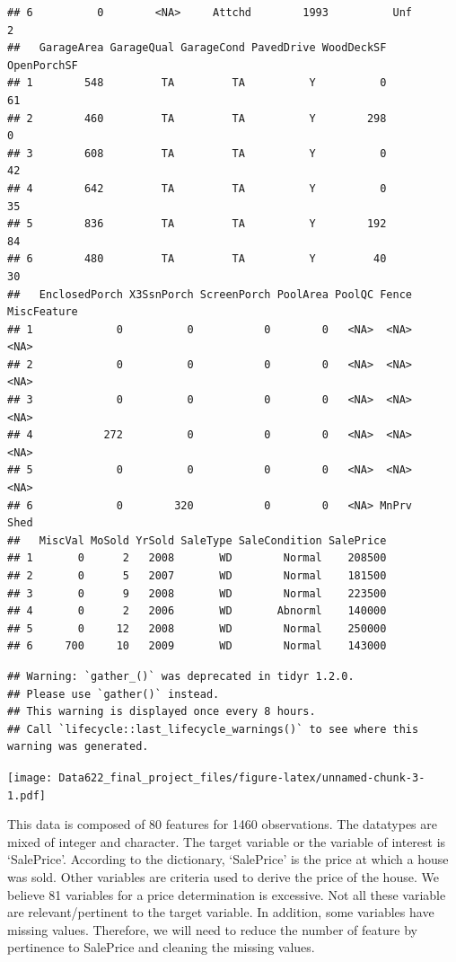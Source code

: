 \documentclass[
]{article}
\begin{document}
\begin{verbatim}
## 6          0        <NA>     Attchd        1993          Unf          2
##   GarageArea GarageQual GarageCond PavedDrive WoodDeckSF OpenPorchSF
## 1        548         TA         TA          Y          0          61
## 2        460         TA         TA          Y        298           0
## 3        608         TA         TA          Y          0          42
## 4        642         TA         TA          Y          0          35
## 5        836         TA         TA          Y        192          84
## 6        480         TA         TA          Y         40          30
##   EnclosedPorch X3SsnPorch ScreenPorch PoolArea PoolQC Fence MiscFeature
## 1             0          0           0        0   <NA>  <NA>        <NA>
## 2             0          0           0        0   <NA>  <NA>        <NA>
## 3             0          0           0        0   <NA>  <NA>        <NA>
## 4           272          0           0        0   <NA>  <NA>        <NA>
## 5             0          0           0        0   <NA>  <NA>        <NA>
## 6             0        320           0        0   <NA> MnPrv        Shed
##   MiscVal MoSold YrSold SaleType SaleCondition SalePrice
## 1       0      2   2008       WD        Normal    208500
## 2       0      5   2007       WD        Normal    181500
## 3       0      9   2008       WD        Normal    223500
## 4       0      2   2006       WD       Abnorml    140000
## 5       0     12   2008       WD        Normal    250000
## 6     700     10   2009       WD        Normal    143000
\end{verbatim}

\begin{verbatim}
## Warning: `gather_()` was deprecated in tidyr 1.2.0.
## Please use `gather()` instead.
## This warning is displayed once every 8 hours.
## Call `lifecycle::last_lifecycle_warnings()` to see where this warning was generated.
\end{verbatim}

\texttt{[image: Data622\_final\_project\_files/figure-latex/unnamed-chunk-3-1.pdf]}

This data is composed of 80 features for 1460 observations. The
datatypes are mixed of integer and character. The target variable or the
variable of interest is `SalePrice'. According to the dictionary,
`SalePrice' is the price at which a house was sold. Other variables are
criteria used to derive the price of the house. We believe 81 variables
for a price determination is excessive. Not all these variable are
relevant/pertinent to the target variable. In addition, some variables
have missing values. Therefore, we will need to reduce the number of
feature by pertinence to SalePrice and cleaning the missing values.
\end{document}
